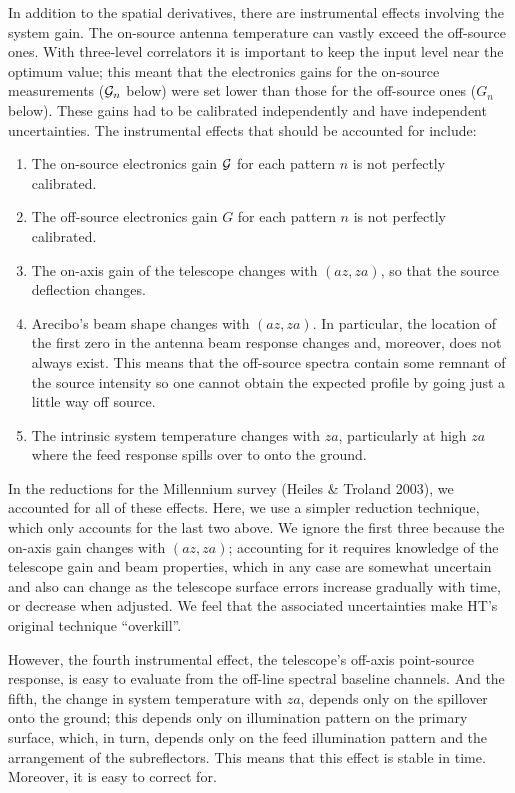 \documentclass[12pt,preprint]{aastex}
\begin{document}
In addition to the spatial derivatives, there are instrumental effects
involving the system gain. The on-source antenna temperature can vastly
exceed the off-source ones.  With three-level correlators it is
important to keep the input level near the optimum value; this meant
that the electronics gains for the on-source measurements (${\cal G}_n$
below) were set lower than those for the off-source ones ($G_n$ below).
These gains had to be calibrated independently and have independent
uncertainties. The instrumental effects
that should be accounted for include: \begin{enumerate}

\item The on-source electronics gain ${\cal G}$ for each pattern
$n$ is not perfectly calibrated. 

\item The off-source electronics gain $G$ for each pattern $n$ is not
perfectly calibrated. 

\item The on-axis gain of the telescope changes with $(az,za)$, so that
the source deflection changes. 

\item Arecibo's beam shape changes with $(az,za)$.  In particular, the
location of the first zero in the antenna beam response changes and,
moreover, does not always exist.  This means that the off-source spectra
contain some remnant of the source intensity so one cannot obtain the
expected profile by going just a little way off source. 

\item The intrinsic system temperature changes with $za$, particularly
  at high $za$ where the feed response spills over to onto the ground. 

\end{enumerate}

In the reductions for the Millennium survey (Heiles \& Troland 2003), we
accounted for all of these effects. Here, we use a simpler reduction
technique, which only accounts for the last two above.  We ignore the
first three because the on-axis gain changes with $(az,za)$; accounting
for it requires
knowledge of the telescope gain and beam properties, which in any case
are somewhat uncertain and also can change as the telescope surface
errors increase gradually with time, or decrease when adjusted. We feel
that the associated uncertainties make HT's original technique
``overkill''.

However, the fourth instrumental effect, the telescope's off-axis
point-source response, is easy to evaluate from the off-line spectral
baseline channels. And the fifth, the change in system temperature with
$za$, depends only on the spillover onto the ground; this depends only
on illumination pattern on the primary surface, which, in turn, depends
only on the feed illumination pattern and the arrangement of the
subreflectors. This means that this effect is stable in time. Moreover,
it is easy to correct for.
\end{document}
